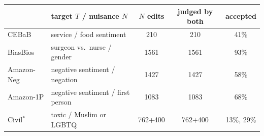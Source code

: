 \begin{tabular}{@{}llccc@{}}
\toprule
 & target $T$ / nuisance $N$ & $N$ edits & judged by both & accepted \\
\midrule
CEBaB & service / food sentiment & 210 & 210 & 41\% \\
BiasBios & surgeon vs.\ nurse / gender & 1561 & 1561 & 93\% \\
Amazon-Neg & negative sentiment / negation & 1427 & 1427 & 58\% \\
Amazon-1P & negative sentiment / first person & 1083 & 1083 & 68\% \\
Civil$^*$ & toxic / Muslim or LGBTQ & 762+400 & 762+400 & 13\%, 29\% \\
\bottomrule
\end{tabular}
